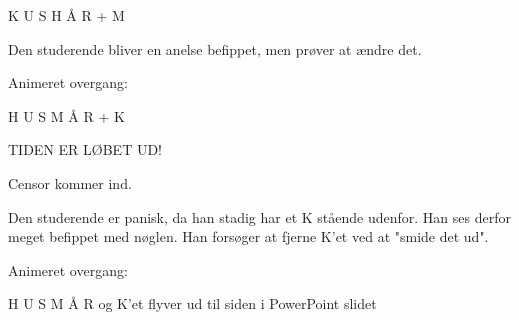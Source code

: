 \documentclass[a4paper,12pt]{article}
\begin{document}
\begin{sketch}
K U S H Å R     + M

\scene Den studerende bliver en anelse befippet, men prøver at ændre det.

Animeret overgang:

H U S M Å R     + K

 TIDEN ER LØBET UD!

\scene Censor kommer ind. 

\scene  Den studerende er panisk, da han stadig har et K stående udenfor. Han ses derfor meget befippet med nøglen. Han forsøger at fjerne K'et ved at "smide det ud".

Animeret overgang:

	H U S M Å R  og K'et flyver ud til siden i PowerPoint slidet




\end{sketch}
\end{document}
